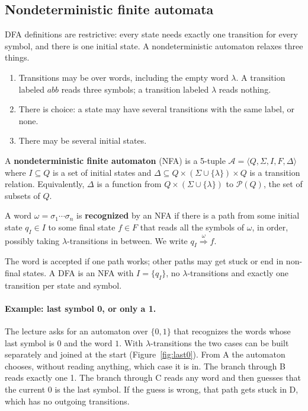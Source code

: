 \subsection{Nondeterministic finite automata}

DFA definitions are restrictive: every state needs exactly one transition for
every symbol, and there is one initial state. A nondeterministic automaton
relaxes three things.
\begin{enumerate}
  \item Transitions may be over words, including the empty word $\lambda$.
    A transition labeled $abb$ reads three symbols; a transition labeled
    $\lambda$ reads nothing.
  \item There is choice: a state may have several transitions with the same
    label, or none.
  \item There may be several initial states.
\end{enumerate}

\begin{definition}
A \textbf{nondeterministic finite automaton} (NFA) is a 5-tuple $\mathcal{A} =
\langle Q, \Sigma, I, F, \Delta \rangle$ where $I \subseteq Q$ is a set of
initial states and $\Delta \subseteq Q \times (\Sigma \cup \{\lambda\}) \times Q$
is a transition relation. Equivalently, $\Delta$ is a function from $Q \times
(\Sigma \cup \{\lambda\})$ to $\mathcal{P}(Q)$, the set of subsets of $Q$.
\end{definition}

\begin{definition}
A word $\omega = \sigma_1 \cdots \sigma_n$ is \textbf{recognized} by an NFA if
there is a path from some initial state $q_I \in I$ to some final state
$f \in F$ that reads all the symbols of $\omega$, in order, possibly taking
$\lambda$-transitions in between. We write $q_I \stackrel{\omega}{\Longrightarrow} f$.
\end{definition}

The word is accepted if one path works; other paths may get stuck or end in
non-final states. A DFA is an NFA with $I = \{q_I\}$, no $\lambda$-transitions
and exactly one transition per state and symbol.

\paragraph{Example: last symbol 0, or only a 1.} The lecture asks for an
automaton over $\{0,1\}$ that recognizes the words whose last symbol is 0 and
the word $1$. With $\lambda$-transitions the two cases can be built
separately and joined at the start (Figure~\ref{fig:last0}). From A the
automaton chooses, without reading anything, which case it is in. The
branch through B reads exactly one 1. The branch through C reads any word and
then guesses that the current 0 is the last symbol. If the guess is wrong,
that path gets stuck in D, which has no outgoing transitions.

